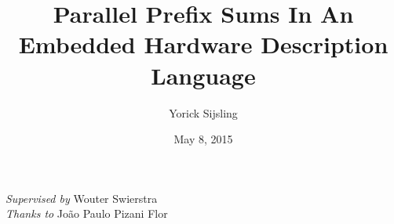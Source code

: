 \documentclass[a4paper]{article}
\title{Parallel Prefix Sums In An Embedded Hardware Description
Language}
\date{May 8, 2015}
\author{Yorick Sijsling}
\begin{document}
\maketitle

\begin{flushright}
\emph{Supervised by} Wouter Swierstra\\
\emph{Thanks to} João Paulo Pizani Flor
\end{flushright}






\end{document}
